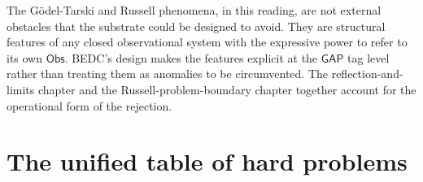 \begin{remark}
\label{rem:hard-problems-not-obstacles-but-features}
The G\"{o}del-Tarski and Russell phenomena, in this reading, are not external obstacles that the substrate could be designed to avoid. They are structural features of any closed observational system with the expressive power to refer to its own $\mathsf{Obs}$. BEDC's design makes the features explicit at the $\mathsf{GAP}$ tag level rather than treating them as anomalies to be circumvented. The reflection-and-limits chapter and the Russell-problem-boundary chapter together account for the operational form of the rejection.
\end{remark}

\section{The unified table of hard problems}
\label{sec:hard-problems-unified-table}

